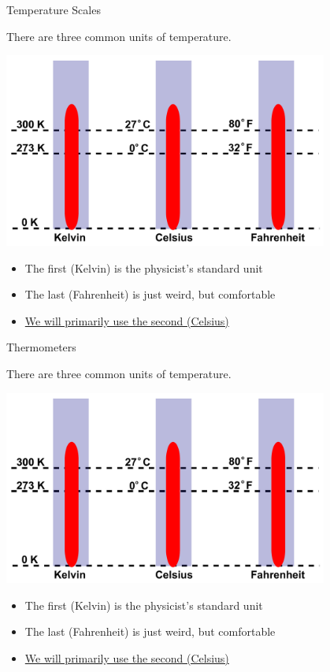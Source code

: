 \documentclass[12pt]{beamer}
\begin{document}
\begin{frame}{Temperature Scales}

There are three common units of temperature.

\begin{center}
\includegraphics[width=0.8\textwidth]{images/temperature-scales}
\end{center}

\begin{itemize}
\item The first (Kelvin) is the physicist's standard unit
\item The last (Fahrenheit) is just weird, but comfortable
\item \underline{We will primarily use the second (Celsius)}
\end{itemize}

\end{frame}
\begin{frame}{Thermometers}

There are three common units of temperature.

\begin{center}
\includegraphics[width=0.8\textwidth]{images/temperature-scales}
\end{center}

\begin{itemize}
\item The first (Kelvin) is the physicist's standard unit
\item The last (Fahrenheit) is just weird, but comfortable
\item \underline{We will primarily use the second (Celsius)}
\end{itemize}

\end{frame}
\end{document}
